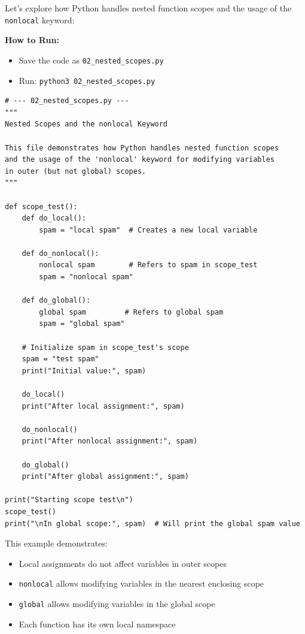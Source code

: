 \documentclass[12pt,letterpaper]{article}
\newcommand{\code}[1]{\texttt{\textcolor{accentColor}{#1}}}
\newenvironment{macterminal}{%
    \begin{mdframed}[
        linecolor=terminalFrame,
        backgroundcolor=terminalBg,
        roundcorner=5pt,
        skipabove=5pt,
        skipbelow=5pt,
        linewidth=1pt,
        innertopmargin=5pt,
        frametitle={%
            \tikz[baseline=(current bounding box.east), outer sep=0pt]{
                \fill[red!80!black] (0,0) circle (5pt);
                \fill[yellow!80!black] (0.7,0) circle (5pt);
                \fill[green!70!black] (1.4,0) circle (5pt);
            }
        },
        frametitlealignment=\raggedright,
        frametitleaboveskip=8pt,
        frametitlebelowskip=0pt,
    ]
}{%
    \end{mdframed}%
}
\begin{document}
Let's explore how Python handles nested function scopes and the usage of the \texttt{nonlocal} keyword:

\textbf{How to Run:}
\begin{itemize}
    \item Save the code as \verb|02_nested_scopes.py|
    \item Run: \verb|python3 02_nested_scopes.py|
\end{itemize}

\begin{macterminal}
\begin{lstlisting}
# --- 02_nested_scopes.py ---
"""
Nested Scopes and the nonlocal Keyword

This file demonstrates how Python handles nested function scopes
and the usage of the 'nonlocal' keyword for modifying variables
in outer (but not global) scopes.
"""

def scope_test():
    def do_local():
        spam = "local spam"  # Creates a new local variable

    def do_nonlocal():
        nonlocal spam        # Refers to spam in scope_test
        spam = "nonlocal spam"

    def do_global():
        global spam         # Refers to global spam
        spam = "global spam"

    # Initialize spam in scope_test's scope
    spam = "test spam"
    print("Initial value:", spam)
    
    do_local()
    print("After local assignment:", spam)
    
    do_nonlocal()
    print("After nonlocal assignment:", spam)
    
    do_global()
    print("After global assignment:", spam)

print("Starting scope test\n")
scope_test()
print("\nIn global scope:", spam)  # Will print the global spam value
\end{lstlisting}
\end{macterminal}

This example demonstrates:
\begin{itemize}
    \item Local assignments do not affect variables in outer scopes
    \item \code{nonlocal} allows modifying variables in the nearest enclosing scope
    \item \code{global} allows modifying variables in the global scope
    \item Each function has its own local namespace
\end{itemize}
\end{document}
